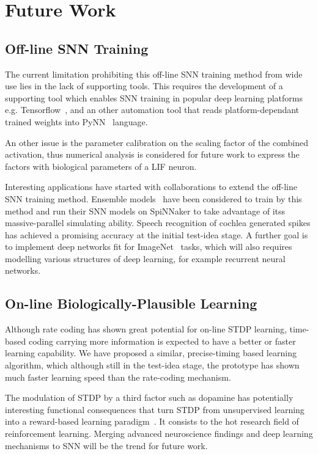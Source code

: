 \section{Future Work}
\subsection{Off-line SNN Training}
The current limitation prohibiting this off-line SNN training method from wide use lies in the lack of supporting tools.
This requires the development of a supporting tool which enables SNN training in popular deep learning platforms e.g. Tensorflow~\cite{tensorflow2015-whitepaper}, and an other automation tool that reads platform-dependant trained weights into PyNN~\cite{davison2008pynn} language.

An other issue is the parameter calibration on the scaling factor of the combined activation, thus numerical analysis is considered for future work to express the factors with biological parameters of a LIF neuron.

Interesting applications have started with collaborations to extend the off-line SNN training method.
Ensemble models~\cite{rokach2010ensemble} have been considered to train by this method and run their SNN models on SpiNNaker to take advantage of itss massive-parallel simulating ability.
Speech recognition of cochlea generated spikes has achieved a promising accuracy at the initial test-idea stage.
A further goal is to implement deep networks fit for ImageNet~\cite{deng2009imagenet} tasks, which will also requires modelling various structures of deep learning, for example recurrent neural networks.


\subsection{On-line Biologically-Plausible Learning}
Although rate coding has shown great potential for on-line STDP learning, time-based coding carrying more information is expected to have a better or faster learning capability.
We have proposed a similar, precise-timing based learning algorithm, which although still in the test-idea stage, the prototype has shown much faster learning speed than the rate-coding mechanism.

The modulation of STDP by a third factor such as dopamine has potentially interesting functional consequences that turn STDP from unsupervised learning into a reward-based learning paradigm~\cite{izhikevich2007solving}.
It consists to the hot research field of reinforcement learning.
Merging advanced neuroscience findings and deep learning mechanisms to SNN will be the trend for future work.


